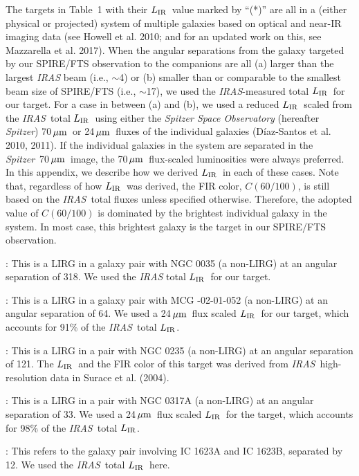 \documentclass[preprint]{aastex}
\newcommand{\um}{\mbox{$\,\mu{\rm m}$}}
\newcommand{\IRAS}{{\it IRAS}}
\newcommand{\Spitzer}{{\it Spitzer}}
\newcommand{\LIR}{\mbox{$L_{\rm IR}$}}
\begin{document}
The targets in Table~1 with their \LIR\ value marked by ``(*)'' are all in a (either physical 
or projected) system of multiple galaxies based on optical and near-IR imaging data 
(see Howell et al. 2010; and for an updated work on this, see Mazzarella et al. 2017).
When the angular separations from the galaxy targeted by our SPIRE/FTS 
observation to the companions are all (a) larger than the largest {\it IRAS} beam (i.e., 
$\sim$4\arcmin) or (b) smaller than or comparable to the smallest beam size of SPIRE/FTS
(i.e., $\sim$17\arcsec), we used the \IRAS-measured total \LIR\ for our target. 
For a case in between (a) and (b), we used a reduced \LIR\ scaled from the \IRAS\ total
\LIR\ using either the {\it Spitzer Space Observatory} (hereafter \Spitzer) 70\um\ or 
24\um\ fluxes of the individual galaxies (D\'iaz-Santos et al. 2010, 2011).  
If the individual galaxies in the system are separated in the \Spitzer\ 70\um\ image, 
the 70\um\ flux-scaled luminosities were always preferred.  In this appendix, we describe 
how we derived \LIR\ in each of these cases.  Note that, regardless of how \LIR\ was derived, 
the FIR color, $C(60/100)$, is still based on the \IRAS\ total fluxes unless specified 
otherwise. Therefore, the adopted value of $C(60/100)$ is dominated by the brightest 
individual galaxy in the system.  In most case, this brightest galaxy is the target in
our SPIRE/FTS observation.


: This is a LIRG in a galaxy pair with NGC 0035 (a non-LIRG) at an angular 
          separation of 318\arcsec.  We used the {\it IRAS} total \LIR\ for our target.

: This is a LIRG in a galaxy pair with MCG -02-01-052 (a non-LIRG)
          at an angular separation of 64\arcsec. We used a 24\um\ flux scaled \LIR\ for 
          our target, which accounts for 91\% of the \IRAS\ total \LIR.

: This is a LIRG in a pair with NGC 0235 (a non-LIRG) at an angular 
          separation of 121\arcsec.  The \LIR\ and the FIR color of this target was derived 
	    from \IRAS\ high-resolution data in Surace et al. (2004).

: This is a LIRG in a pair with NGC 0317A (a non-LIRG) at an angular 
          separation of 33\arcsec. We used a 24\um\ flux scaled \LIR\ for the target, 
          which accounts for 98\% of the \IRAS\ total \LIR.

: This refers to the galaxy pair involving IC 1623A and IC 1623B, separated 
          by 12\arcsec.  We used the \IRAS\ total \LIR\ here.
\end{document}

